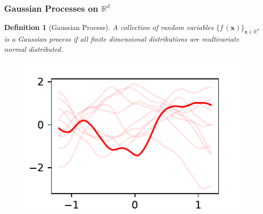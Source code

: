 \documentclass{beamer}
\DeclareMathOperator{\MVN}{MVN}
\newcommand{\R}{\mathbb{R}}
\newtheorem{definnn}{Definition}
\begin{document}
\begin{frame}
    \frametitle{Gaussian Processes on $\R^d$}
    \begin{definnn}[Gaussian Process]
        A collection of random variables $\{f\,(\mathbf{x})\}_{\mathbf{x}\in\R^d}$
        is a \emph{Gaussian process} if all finite dimensional distributions are
        multivariate normal distributed.
    \end{definnn}
    \begin{figure}
        \centering
        \includegraphics{maternfivehalves_kernel.pdf}
    \end{figure}
\end{frame}

\end{document}
